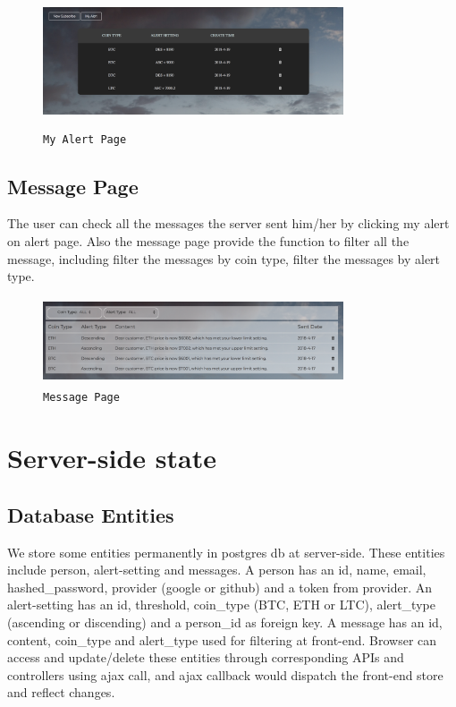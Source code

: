 \begin{figure}[!htb]
\includegraphics[height=1.5in, width=3.5in]{myalert.png}
\caption{\texttt{My Alert Page}}
\end{figure}

\subsection{Message Page}
The user can check all the messages the server sent him/her by clicking my alert on alert
page. Also the message page provide the function to filter all the message, including filter
the messages by coin type, filter the messages by alert type.

\begin{figure}[!htb]
\includegraphics[height=1.0in, width=3.5in]{message.png}
\caption{\texttt{Message Page}}
\end{figure}





\section{Server-side state}
\subsection{Database Entities}
We store some entities permanently in postgres db at server-side. 
These entities include person, alert-setting and messages. 
A person has an id, name, email, hashed\_password, provider 
(google or github) and a token from provider. An alert-setting 
has an id, threshold, coin\_type (BTC, ETH or LTC), alert\_type 
(ascending or discending) and a person\_id as foreign key. 
A message has an id, content, coin\_type and alert\_type used 
for filtering at front-end. Browser can access and update/delete 
these entities through corresponding APIs and controllers using 
ajax call, and ajax callback would dispatch the front-end store 
and reflect changes.

